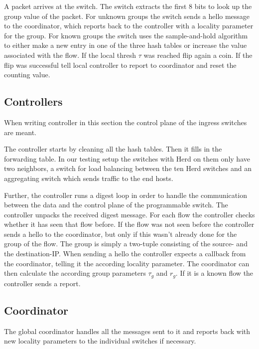 \documentclass[11pt,oneside,a4paper]{article}
\begin{document}
A packet arrives at the switch. The switch extracts the first 8 bits to look up the group value of the packet. For unknown groups the switch sends a hello message to the coordinator, which reports back to the controller with a locality parameter for the group. For known groups the switch uses the sample-and-hold algorithm to either make a new entry in one of the three hash tables or increase the value associated with the flow. If the local thresh $\tau$ was reached flip again a coin. If the flip was successful tell local controller to report to coordinator and reset the counting value. \\

\subsection{Controllers} \label{controller}
When writing controller in this section the control plane of the ingress switches are meant. 

The controller starts by cleaning all the hash tables. Then it fills in the forwarding table. In our testing setup the switches with Herd on them only have two neighbors, a switch for load balancing between the ten Herd switches and an aggregating switch which sends traffic to the end hosts.

Further, the controller runs a digest loop in order to handle the communication between the data and the control plane of the programmable switch. The controller unpacks the received digest message. For each flow the controller checks whether it has seen that flow before. If the flow was not seen before the controller sends a hello to the coordinator, but only if this wasn't already done for the group of the flow. The group is simply a two-tuple consisting of the source- and the destination-IP. When sending a hello the controller expects a callback from the coordinator, telling it the according locality parameter. The coordinator can then calculate the according group parameters $\tau_g$ and $r_g$. If it is a known flow the controller sends a report. \\

\subsection{Coordinator} \label{coordinator}

The global coordinator handles all the messages sent to it and reports back with new locality parameters to the individual switches if necessary. 
\end{document}
